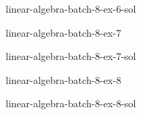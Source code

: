 \documentclass[preview]{standalone}
\begin{document}
\begin{snippetsolution}{linear-algebra-batch-8-ex-6-sol}{}
    \todo
\end{snippetsolution}

\begin{snippetexercise}{linear-algebra-batch-8-ex-7}{}
    \todo
\end{snippetexercise}

\begin{snippetsolution}{linear-algebra-batch-8-ex-7-sol}{}
    \todo
\end{snippetsolution}

\begin{snippetexercise}{linear-algebra-batch-8-ex-8}{}
    \todo
\end{snippetexercise}

\begin{snippetsolution}{linear-algebra-batch-8-ex-8-sol}{}
    \todo
\end{snippetsolution}
\end{document}
